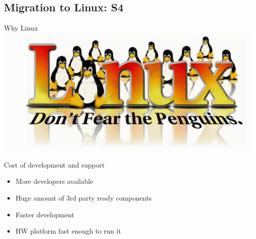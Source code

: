 \documentclass{beamer}
\begin{document}
  \subsection{Migration to Linux: S4}
  \begin{frame}{Why Linux}
	  \includegraphics[scale=0.4]{dont-fear-the-penguins.jpg}
	  \pause

	  \alert{Cost of development and support}
	  \begin{itemize}
		  \item More developers available
		  \item Huge amount of 3rd party ready components
		  \item Faster development
		  \item HW platform fast enough to run it
	  \end{itemize}

  \end{frame}
\end{document}
